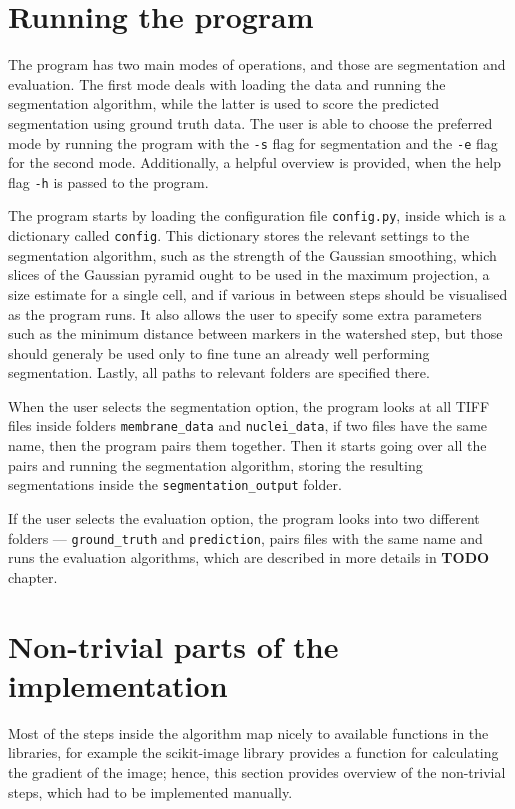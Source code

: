 \documentclass[
  digital,     %
  oneside,     %
  nosansbold,  %
  nocolorbold, %
  lof,         %
  lot,         %
]{fithesis4}
\begin{document}
\section{Running the program}

The program has two main modes of operations, and those are segmentation and
evaluation. The first mode deals with loading the data and running the
segmentation algorithm, while the latter is used to score the predicted
segmentation using ground truth data. The user is able to choose the preferred
mode by running the program with the \texttt{-s} flag for segmentation and the
\texttt{-e} flag for the second mode. Additionally, a helpful overview is
provided, when the help flag \texttt{-h} is passed to the program.

The program starts by loading the configuration file \texttt{config.py}, inside which is a
dictionary called \texttt{config}. This dictionary stores the relevant settings to the
segmentation algorithm, such as the strength of the Gaussian smoothing, which
slices of the Gaussian pyramid ought to be used in the maximum projection, a
size estimate for a single cell, and if various in between steps should be
visualised as the program runs. It also allows the user to specify some extra
parameters such as the minimum distance between markers in the watershed step,
but those should generaly be used only to fine tune an already well performing
segmentation. Lastly, all paths to relevant folders are specified there.

When the user selects the segmentation option, the program looks at all TIFF
files inside folders \texttt{membrane\_data} and \texttt{nuclei\_data}, if two files have the
same name, then the program pairs them together. Then it starts going over all
the pairs and running the segmentation algorithm, storing the resulting
segmentations inside the \texttt{segmentation\_output} folder.

If the user selects the evaluation option, the program looks into two different
folders --- \texttt{ground\_truth} and \texttt{prediction}, pairs files with the
same name and runs the evaluation algorithms, which are described in more
details in \textbf{TODO} chapter.
\section{Non-trivial parts of the implementation}
Most of the steps inside the algorithm map nicely to available functions in the
libraries, for example the scikit-image library provides a function for
calculating the gradient of the image; hence, this section provides overview of
the non-trivial steps, which had to be implemented manually.
\end{document}
